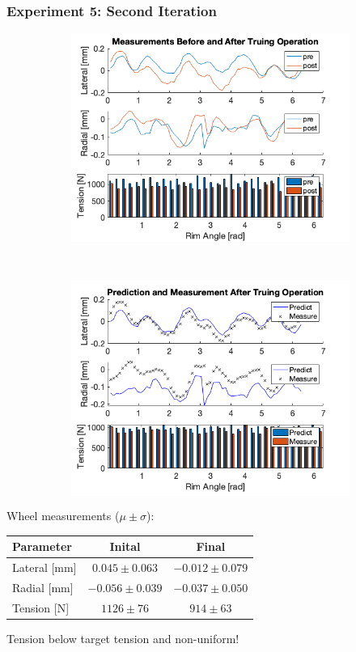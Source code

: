 \documentclass[mathserif]{beamer}
\begin{document}
\begin{frame}
\frametitle{Experiment 5: Second Iteration}
\begin{figure}
        \centering
        \begin{subfigure}[b]{0.45\textwidth}
            \includegraphics[width=\textwidth]{exp5_pre_post}
        \end{subfigure}
        ~
        \begin{subfigure}[b]{0.45\textwidth}
            \includegraphics[width=\textwidth]{exp5_predict_measure}
        \end{subfigure}
\end{figure}
Wheel measurements ($\mu \pm \sigma$):
\centering
\begin{tabular}{| l | c | c |}
    \hline
    Parameter & Inital & Final \\ \hline
    Lateral [mm] & $0.045\pm0.063$ &$-0.012\pm 0.079$ \\ \hline 
    Radial [mm] &$-0.056\pm0.039$& $-0.037\pm0.050$ \\ \hline 
    Tension [N] &$1126\pm76$& $914\pm63$ \\ \hline 
\end{tabular}
\begin{block}{}
    Tension below target tension and non-uniform!
\end{block}
\end{frame}
\end{document}
